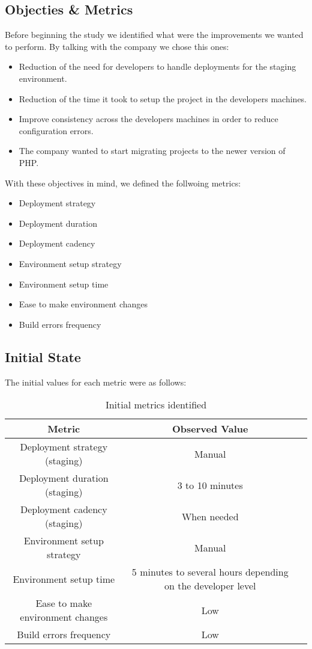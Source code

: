         \subsection{Objecties \& Metrics}
        Before beginning the study we identified what were the improvements we wanted to perform. By talking with the company we chose this ones:
        \begin{itemize}
            \item Reduction of the need for developers to handle deployments for the staging environment.
            \item Reduction of the time it took to setup the project in the developers machines.
            \item Improve consistency across the developers machines in order to reduce configuration errors.
            \item The company wanted to start migrating projects to the newer version of PHP.
        \end{itemize}
        With these objectives in mind, we defined the follwoing metrics:
        \begin{itemize}
  			\item Deployment strategy
				\item Deployment duration
				\item Deployment cadency
				\item Environment setup strategy
				\item Environment setup time
				\item Ease to make environment changes
				\item Build errors frequency
			\end{itemize}
			\subsection{Initial State}
			The initial values for each metric were as follows:
			\begin{table}[h!]
				\begin{center}
					\begin{tabular}{| c | c | c |}
						\hline
	 					\textbf{Metric} & \textbf{Observed Value} \\ \hline
	 					Deployment strategy (staging) 		& Manual  \\ \hline
						Deployment duration (staging) 		& 3 to 10 minutes \\ \hline
						Deployment cadency (staging)  		& When needed \\ \hline
						Environment setup strategy			& Manual \\ \hline
						Environment setup time 				& 5 minutes to several hours depending on the developer level \\ \hline
						Ease to make environment changes 	& Low \\ \hline
						Build errors frequency				& Low \\ \hline
					\end{tabular}
				\end{center}
				\caption{Initial metrics identified}
			\end{table}

